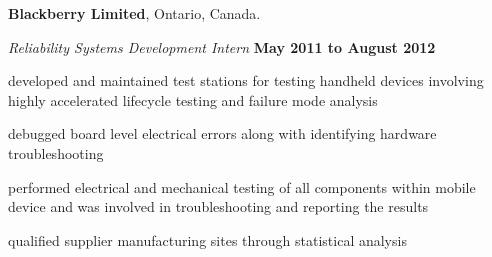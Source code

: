 \documentclass[10pt]{article}
\newenvironment{outerlist}[1][\enskip\textperiodcentered
]%
        {\begin{itemize}[#1]}{\end{itemize}%
         \vspace{-.6\baselineskip}}
\newenvironment{innerlist}[1][\enskip\textperiodcentered
]%
        {\begin{compactitem}[#1]}{\end{compactitem}}
\newcommand{\blankline}{\quad\pagebreak[2]}
\begin{document}
{\textbf{Blackberry Limited}}, Ontario, Canada.
\begin{outerlist}
	\item[] \textit{Reliability Systems Development Intern}
	\hfill  \textbf{May 2011 to August 2012}
\begin{innerlist}
	\item developed and maintained test stations for testing handheld devices involving highly accelerated lifecycle testing and failure mode analysis
    \item debugged board level electrical errors along with identifying hardware troubleshooting
    \item performed electrical and mechanical testing of all components within mobile device and was involved in troubleshooting and reporting the results
    \item qualified supplier manufacturing sites through statistical analysis
\end{innerlist}
\end{outerlist}

\blankline


\blankline

\end{document}
